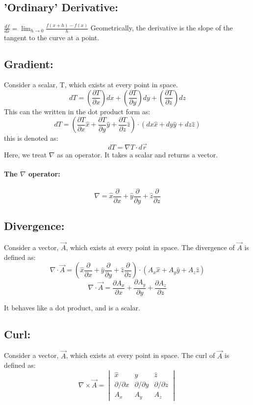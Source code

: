 \documentclass{article}
\begin{document}
\subsection{'Ordinary' Derivative: } $\frac{df}{dx} = \lim_{h \to 0} \frac{f(x+h) - f(x)}{h}$
Geometrically, the derivative is the slope of the tangent to the curve at a point.

\subsection{Gradient:} Consider a scalar, T, which exists at every point in space. 
\[d T = \left(\frac{\partial T}{\partial x}\right)dx + \left(\frac{\partial T}{\partial y}\right)dy + \left(\frac{\partial T}{\partial z}\right)dz\]
This can the written in the dot product form as:
\[d T = \left(\frac{\partial T}{\partial x}\hat{x} + \frac{\partial T}{\partial y}\hat{y} + \frac{\partial T}{\partial z}\hat{z} \right) \cdot (dx \hat{x} + dy \hat{y} + dz \hat{z} )\]
this is denoted as:
\[d T = \nabla T \cdot d\vec{r}\]
Here, we treat $\nabla$ as an operator. It takes a scalar and returns a vector.

\paragraph*{The $\nabla$ operator: } \[\nabla = \hat{x} \frac{\partial}{\partial x} + \hat{y} \frac{\partial}{\partial y} + \hat{z} \frac{\partial}{\partial z}\]

\subsection{Divergence: } Consider a vector, $\vec{A}$, which exists at every point in space. The divergence of $\vec{A}$ is defined as:
\[ \nabla \cdot \vec{A} = \left(\hat{x} \frac{\partial}{\partial x} + \hat{y} \frac{\partial}{\partial y} + \hat{z} \frac{\partial}{\partial z}{}\right) \cdot \left(A_x \hat{x} + A_y \hat{y} + A_z \hat{z}\right)\]
\[ \nabla \cdot \vec{A} = \frac{\partial A_x}{\partial x} + \frac{\partial A_y}{\partial y} + \frac{\partial A_z}{\partial z}\]

It behaves like a dot product, and is a scalar.

\subsection{Curl: } Consider a vector, $\vec{A}$, which exists at every point in space. The curl of $\vec{A}$ is defined as:
\[\nabla \times \vec{A}  = \begin{vmatrix}
    \hat{x} & \hat{y} & \hat{z} \\
    \partial/\partial x & \partial/\partial y & \partial/\partial z \\    
    A_x & A_y & A_z 
\end{vmatrix}\]
\end{document}
